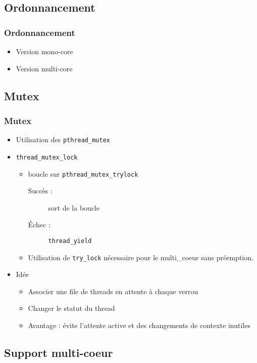 \documentclass{beamer}
\begin{document}
\subsection{Ordonnancement}

\begin{frame}
  \frametitle{Ordonnancement}
  \begin{itemize}
    \item Version mono-core
    \item Version multi-core
  \end{itemize}
\end{frame}

\subsection{Mutex}

\begin{frame}[containsverbatim]
  \frametitle{Mutex}
  \begin{itemize}
    \item Utilisation des \verb!pthread_mutex!
    \item \verb!thread_mutex_lock!
      \begin{itemize}
        \item boucle sur \verb!pthread_mutex_trylock!
          \begin{description}
          \item[Succès :] sort de la boucle
          \item[Échec :]  \verb!thread_yield!
          \end{description}
        \item Utilisation de \verb!try_lock! nécessaire pour le
          multi\_coeur sans préemption.
      \end{itemize}
      \item Idée
        \begin{itemize}
        \item Associer une file de threads en attente à chaque verrou
        \item Changer le statut du thread
        \item Avantage : évite l'attente active et des changements de
          contexte inutiles
        \end{itemize}
  \end{itemize}
\end{frame}

\subsection{Support multi-coeur}
\end{document}
